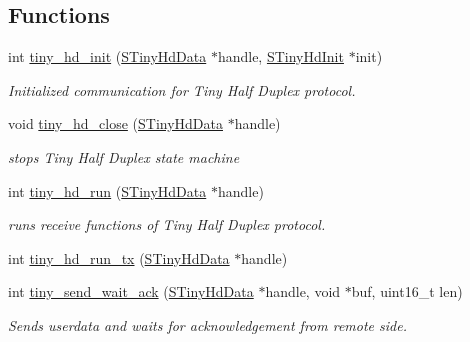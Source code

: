 \subsection*{Functions}
\begin{DoxyCompactItemize}
\item 
int \hyperlink{group__HALF__DUPLEX__API_ga747e6a3a0b5d2a9e1fe0c143c20057e9}{tiny\+\_\+hd\+\_\+init} (\hyperlink{group__HALF__DUPLEX__API_gaf9f81ad129b754a780dfca5dcd7f7cf9}{S\+Tiny\+Hd\+Data} $\ast$handle, \hyperlink{group__HALF__DUPLEX__API_ga784f1a0f0ae7f06da4bc288fa3f22408}{S\+Tiny\+Hd\+Init} $\ast$init)
\begin{DoxyCompactList}\small\item\em Initialized communication for Tiny Half Duplex protocol. \end{DoxyCompactList}\item 
void \hyperlink{group__HALF__DUPLEX__API_ga275846730a88b9654345d5defbda31e7}{tiny\+\_\+hd\+\_\+close} (\hyperlink{group__HALF__DUPLEX__API_gaf9f81ad129b754a780dfca5dcd7f7cf9}{S\+Tiny\+Hd\+Data} $\ast$handle)
\begin{DoxyCompactList}\small\item\em stops Tiny Half Duplex state machine \end{DoxyCompactList}\item 
int \hyperlink{group__HALF__DUPLEX__API_gac962595f09883dea1dd0992a608a17b9}{tiny\+\_\+hd\+\_\+run} (\hyperlink{group__HALF__DUPLEX__API_gaf9f81ad129b754a780dfca5dcd7f7cf9}{S\+Tiny\+Hd\+Data} $\ast$handle)
\begin{DoxyCompactList}\small\item\em runs receive functions of Tiny Half Duplex protocol. \end{DoxyCompactList}\item 
int \hyperlink{group__HALF__DUPLEX__API_ga84325cc961c3f31e2ba6111d0235bd61}{tiny\+\_\+hd\+\_\+run\+\_\+tx} (\hyperlink{group__HALF__DUPLEX__API_gaf9f81ad129b754a780dfca5dcd7f7cf9}{S\+Tiny\+Hd\+Data} $\ast$handle)
\item 
int \hyperlink{group__HALF__DUPLEX__API_ga5aad8dcb504b80bac923496f2686a6d6}{tiny\+\_\+send\+\_\+wait\+\_\+ack} (\hyperlink{group__HALF__DUPLEX__API_gaf9f81ad129b754a780dfca5dcd7f7cf9}{S\+Tiny\+Hd\+Data} $\ast$handle, void $\ast$buf, uint16\+\_\+t len)
\begin{DoxyCompactList}\small\item\em Sends userdata and waits for acknowledgement from remote side. \end{DoxyCompactList}\end{DoxyCompactItemize}



